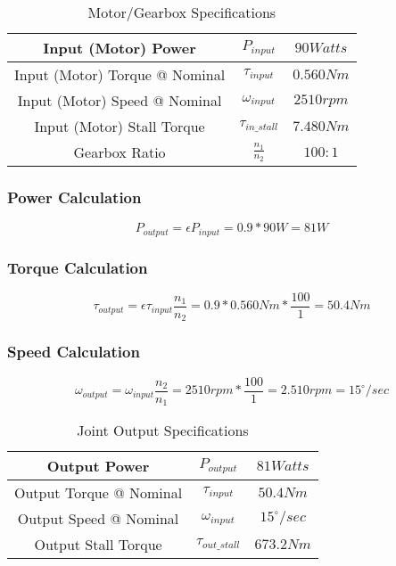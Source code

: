 
\begin{table}[H]
    \centering
    \begin{tabular}{||c|c|c||}
        \hline
        Input (Motor) Power & \(P_{input}\) & \(90 Watts\) \\
        \hline
        Input (Motor) Torque @ Nominal & \(\tau_{input}\) & \(0.560 Nm\) \\
        \hline
        Input (Motor) Speed @ Nominal & \(\omega_{input}\) & \(2510 rpm\) \\
        \hline
        Input (Motor) Stall Torque & \(\tau_{in\_stall}\) & \(7.480 Nm\) \\
        \hline
        Gearbox Ratio & \(\frac{n_1}{n_2}\) & \(100:1\) \\
        \hline
    \end{tabular}
    \caption{Motor/Gearbox Specifications}
    \label{table:ApxMotorGearboxSpecs}
\end{table}

\subsubsection{Power Calculation}
\begin{equation}
    P_{output} = \epsilon P_{input} = 0.9 * 90W = 81W
     \label{eq:PowerCalc}
\end{equation}

\subsubsection{Torque Calculation}
\begin{equation}
    \tau_{output} = \epsilon  \tau_{input} \frac{n_1}{n_2} = 0.9 * 0.560 Nm * \frac{100}{1} = 50.4 Nm
    \label{eq:TorqueCalc}
\end{equation}

\subsubsection{Speed Calculation}
\begin{equation}
    \omega_{output} = \omega_{input}  \frac{n_2}{n_1} = 2510 rpm * \frac{100}{1} = 2.510 rpm = 15^\circ/sec
    \label{eq:SpeedCalc}
\end{equation}

\begin{table}[H]
    \centering
    \begin{tabular}{||c|c|c||}
        \hline
        Output Power & \(P_{output}\) & \(81 Watts\) \\
        \hline
        Output Torque @ Nominal & \(\tau_{input}\) & \(50.4 Nm\) \\
        \hline
        Output Speed @ Nominal & \(\omega_{input}\) & \(15^\circ/sec\) \\
        \hline
        Output Stall Torque & \(\tau_{out\_stall}\) & \(673.2 Nm\) \\
        \hline
    \end{tabular}
    \caption{Joint Output Specifications}
    \label{table:ApxJointSpecs}
\end{table}